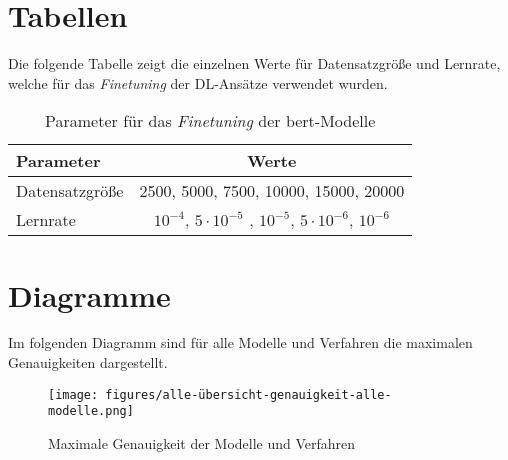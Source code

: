 \section{Tabellen}

Die folgende Tabelle zeigt die einzelnen Werte für Datensatzgröße und Lernrate, welche für das \textit{Finetuning} der DL-Ansätze verwendet wurden.

\begin{table}[h]
    \center
    \begin{tabular}{lc}
        \toprule
        Parameter       & Werte                                                   \\
        \midrule
        Datensatzgröße  & 2500, 5000, 7500, 10000, 15000, 20000                   \\
        Lernrate        & $10^{-4}$, $5\cdot 10^{-5}$ , $10^{-5}$, $5\cdot 10^{-6}$, $10^{-6}$  \\
        \bottomrule
    \end{tabular}
    \caption{Parameter für das \textit{Finetuning} der \gls{bert}-Modelle}
    \label{tab:dl-params}
\end{table}

\section{Diagramme}

Im folgenden Diagramm sind für alle Modelle und Verfahren die maximalen Genauigkeiten dargestellt.

\begin{figure}[H]
    \centering
    \texttt{[image: figures/alle-übersicht-genauigkeit-alle-modelle.png]}
    \caption{Maximale Genauigkeit der Modelle und Verfahren}
    \label{fig:results}
\end{figure}
